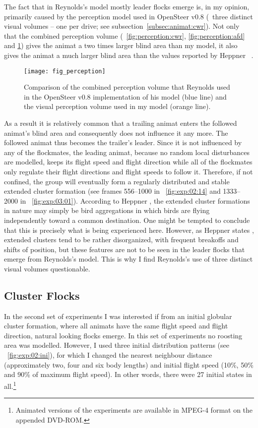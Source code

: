 The fact that in Reynolds's model mostly leader flocks emerge is, in my opinion, primarily caused by the perception model used in OpenSteer v0.8 (\ie\ three distinct visual volumes -- one per drive; see subsection~\ref{subsec:animat:cwr}). Not only that the combined perception volume (\figs~\ref{fig:perception:cwr}, \ref{fig:perception:afd} and \ref{fig:perception}) gives the animat a two times larger blind area than my model, it also gives the animat a much larger blind area than the values reported by Heppner \etal\ \cite{heppner:1985}. 
%
\begin{figure}
	\texttt{[image: fig\_perception]}
	\caption{Comparison of the combined perception volume that Reynolds used in the OpenSteer v0.8 implementation of his model \cite{reynolds:1999} (blue line) and the visual perception volume used in my model (orange line).}
	\label{fig:perception}
\end{figure}
%
As a result it is relatively common that a trailing animat enters the followed animat's blind area and consequently does not influence it any more. The followed animat thus becomes the trailer's leader. Since it is not influenced by any of the flockmates, the leading animat, because no random local disturbances are modelled, keeps its flight speed and flight direction while all of the flockmates only regulate their flight directions and flight speeds to follow it. Therefore, if not confined, the group will eventually form a regularly distributed and stable extended cluster formation (see frames 556--1000 in \fig~\ref{fig:exp:02:14} and 1333--2000 in \fig~\ref{fig:exp:03:01}). According to Heppner \cite{heppner:1974a}, the extended cluster formations in nature may simply be bird aggregations in which birds are flying independently toward a common destination. One might be tempted to conclude that this is precisely what is being experienced here. However, as Heppner states \cite{heppner:1974a}, extended clusters tend to be rather disorganized, with frequent breakoffs and shifts of position, but these features are not to be seen in the leader flocks that emerge from Reynolds's model. This is why I find Reynolds's use of three distinct visual volumes questionable.

\subsection{Cluster Flocks}
In the second set of experiments I was interested if from an initial globular cluster formation, where all animats have the same flight speed and flight direction, natural looking flocks emerge. In this set of experiments no roosting area was modelled. However, I used three initial distribution patterns (see \fig~\ref{fig:exp:02:ini}), for which I changed the nearest neighbour distance (approximately two, four and six body lengths) and initial flight speed (10\%, 50\% and 90\% of maximum flight speed). In other words, there were 27 initial states in all.\footnote{Animated versions of the experiments are available in MPEG-4 format on the appended DVD-ROM.}


